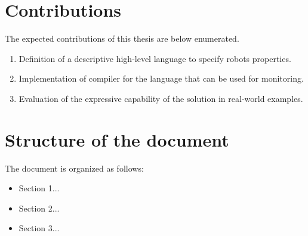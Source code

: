 \section{Contributions}
\label{sec:contributions}

The expected contributions of this thesis are below enumerated.

\begin{enumerate}
    \item Definition of a descriptive high-level language to specify robots properties.
    \item Implementation of compiler for the language that can be used for monitoring.
    \item Evaluation of the expressive capability of the solution in real-world examples.
\end{enumerate}

\section{Structure of the document}
\label{sec:structure}

The document is organized as follows:

\begin{itemize}
    \item Section 1...
    \item Section 2...
    \item Section 3...
\end{itemize}

